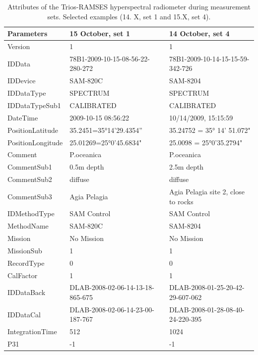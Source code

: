 \documentclass[10pt, a4paper]{article}
\begin{document}
\begin{appendices}
\begin{table}[H]
	\caption{Attributes of the Trios-RAMSES hyperspectral radiometer during measurement sets. Selected examples (14. X, set 1 and 15.X, set 4).}
	\centering
	  \begin{tabular}{| p{3cm} | p{3cm} | p{5cm} |}
		\hline
		    \textbf{Parameters} & \textbf{15 October, set 1} & \textbf{14 October, set 4} \\ \hline \hline
		     Version &1 & 1 \\ \hline
		     IDData & 78B1-2009-10-15-08-56-22-280-272 & 78B1-2009-10-14-15-15-59-342-726 \\ \hline
		     IDDevice & SAM-820C & SAM-8204\\ \hline
		     IDDataType & SPECTRUM & SPECTRUM \\ \hline
		     IDDataTypeSub1 & CALIBRATED & CALIBRATED \\ \hline
		     DateTime & 2009-10-15 08:56:22 & 10/14/2009, 15:15:59 \\ \hline
		     PositionLatitude & 35.2451=35°14'29.4354” & 35.24752 = 35° 14' 51.072" \\ \hline
		     PositionLongitude & 25.01269=25°0'45.6834" & 25.0098 = 25°0'35.2794" \\ \hline
		     Comment & P.oceanica & P.oceanica \\ \hline
		     CommentSub1 & 0.5m depth & 2.5m depth \\ \hline
		     CommentSub2 & diffuse & diffuse \\ \hline
		     CommentSub3 & Agia Pelagia & Agia Pelagia site 2, close to rocks \\ \hline
		     IDMethodType & SAM Control & SAM Control \\ \hline
		    MethodName & SAM-820C & SAM-8204 \\ \hline
		    Mission & No Mission & No Mission \\ \hline
		    MissionSub & 1 & 1 \\ \hline
		    RecordType & 0 & 0 \\ \hline
		    CalFactor & 1 & 1 \\ \hline
		   IDDataBack & DLAB-2008-02-06-14-13-18-865-675 & DLAB-2008-01-25-20-42-29-607-062 \\ \hline
		   IDDataCal & DLAB-2008-02-06-14-23-00-187-767 & DLAB-2008-01-28-08-40-24-220-395 \\ \hline
		   IntegrationTime & 512 & 1024 \\ \hline
		    P31 & -1 & -1 \\ \hline

\end{tabular}
\end{table}
\end{appendices}
\end{document}
